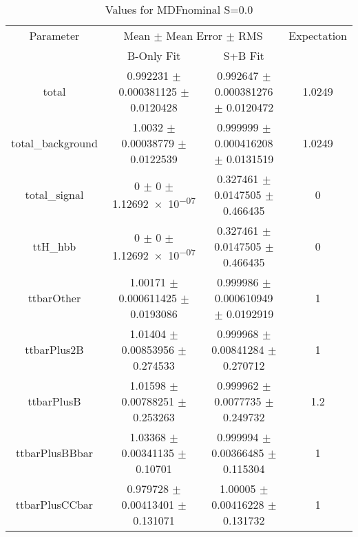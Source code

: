 \begin{table}
\centering
\caption{Values for MDFnominal S=0.0}
\begin{tabular}{cccc}
\toprule
Parameter & \multicolumn{2}{c}{Mean $\pm$ Mean Error $\pm$ RMS} & Expectation\\
 & B-Only Fit & S+B Fit & \\
\midrule
total & \num{0.992231} $\pm$ \num{0.000381125} $\pm$ \num{0.0120428} & \num{0.992647} $\pm$ \num{0.000381276} $\pm$ \num{0.0120472} & \num{1.0249}\\
total\_background & \num{1.0032} $\pm$ \num{0.00038779} $\pm$ \num{0.0122539} & \num{0.999999} $\pm$ \num{0.000416208} $\pm$ \num{0.0131519} & \num{1.0249}\\
total\_signal & \num{0} $\pm$ \num{0} $\pm$ \num{1.12692e-07} & \num{0.327461} $\pm$ \num{0.0147505} $\pm$ \num{0.466435} & \num{0}\\
ttH\_hbb & \num{0} $\pm$ \num{0} $\pm$ \num{1.12692e-07} & \num{0.327461} $\pm$ \num{0.0147505} $\pm$ \num{0.466435} & \num{0}\\
ttbarOther & \num{1.00171} $\pm$ \num{0.000611425} $\pm$ \num{0.0193086} & \num{0.999986} $\pm$ \num{0.000610949} $\pm$ \num{0.0192919} & \num{1}\\
ttbarPlus2B & \num{1.01404} $\pm$ \num{0.00853956} $\pm$ \num{0.274533} & \num{0.999968} $\pm$ \num{0.00841284} $\pm$ \num{0.270712} & \num{1}\\
ttbarPlusB & \num{1.01598} $\pm$ \num{0.00788251} $\pm$ \num{0.253263} & \num{0.999962} $\pm$ \num{0.0077735} $\pm$ \num{0.249732} & \num{1.2}\\
ttbarPlusBBbar & \num{1.03368} $\pm$ \num{0.00341135} $\pm$ \num{0.10701} & \num{0.999994} $\pm$ \num{0.00366485} $\pm$ \num{0.115304} & \num{1}\\
ttbarPlusCCbar & \num{0.979728} $\pm$ \num{0.00413401} $\pm$ \num{0.131071} & \num{1.00005} $\pm$ \num{0.00416228} $\pm$ \num{0.131732} & \num{1}\\
\bottomrule
\end{tabular}
\end{table}